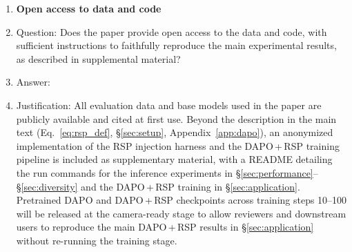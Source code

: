 \begin{enumerate}
\item {\bf Open access to data and code}
    \item[] Question: Does the paper provide open access to the data and code, with sufficient instructions to faithfully reproduce the main experimental results, as described in supplemental material?
    \item[] Answer: \answerYes{}
    \item[] Justification: All evaluation data and base models used in the paper are publicly available and cited at first use. Beyond the description in the main text (Eq.~\eqref{eq:rsp_def}, \S\ref{sec:setup}, Appendix~\ref{app:dapo}), an anonymized implementation of the RSP injection harness and the DAPO\,+\,RSP training pipeline is included as supplementary material, with a README detailing the run commands for the inference experiments in \S\ref{sec:performance}--\S\ref{sec:diversity} and the DAPO\,+\,RSP training in \S\ref{sec:application}. Pretrained DAPO and DAPO\,+\,RSP checkpoints across training steps 10--100 will be released at the camera-ready stage to allow reviewers and downstream users to reproduce the main DAPO\,+\,RSP results in \S\ref{sec:application} without re-running the training stage.


\end{enumerate}
